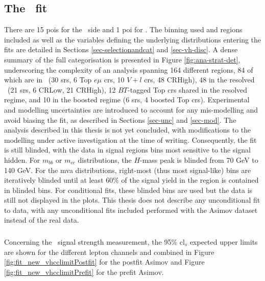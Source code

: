 \subsection[The \vhbc\ Fit]{The \boldvhbc\ fit}\label{subsec-subsecVHBCfit}
There are 15 \glspl{poi} for the \vhb\ side and 1 \gls{poi} for \vhc. The binning used and regions included as well as the variables defining the underlying distributions entering the fits are detailed in Sections \ref{sec-selectionandcat} and \ref{sec-vh-disc}. A dense summary of the full categorisation is presented in Figure \ref{fig:ana-strat-det}, underscoring the complexity of an analysis spanning 164 different regions, 84 of which are in \vhc\ (30 \glspl{sr}, 6 Top $e\mu$ \glspl{cr}, 10 $V+l$ \glspl{cr}, 48 CRHigh), 48 in the resolved \vhb\ (21 \glspl{sr}, 6 CRLow, 21 CRHigh), 12 $BT$-tagged Top \glspl{cr} shared in the resolved regime, and 10 in the boosted regime (6 \glspl{sr}, 4 boosted Top \glspl{cr}). Experimental and modelling uncertainties are introduced to account for any mis-modelling and avoid biasing the fit, as described in Sections \ref{sec-unc} and \ref{sec-mod}. The analysis described in this thesis is not yet concluded, with modifications to the modelling under active investigation at the time of writing. Consequently, the fit is still blinded, with the data in signal regions bins most sensitive to the signal hidden. For $m_{bb}$ or $m_{cc}$ distributions, the $H$-mass peak is blinded from 70 GeV to 140 GeV. For the \gls{mva} distributions, right-most (thus most signal-like) bins are iteratively blinded until at least 60\% of the signal yield in the region is contained in blinded bins. For conditional fits, these blinded bins are used but the data is still not displayed in the plots. This thesis does not describe any unconditional fit to data, with any unconditional fits included performed with the Asimov dataset instead of the real data. %

\subsubsection{\boldvhc}
Concerning the \vhc\ signal strength measurement, the 95\% \gls{cl}$_s$ expected upper limits are shown for the different lepton channels and combined in Figure \ref{fig:fit_new_vhcclimitPostfit} for the postfit Asimov and Figure \ref{fig:fit_new_vhcclimitPrefit} for the prefit Asimov. %

